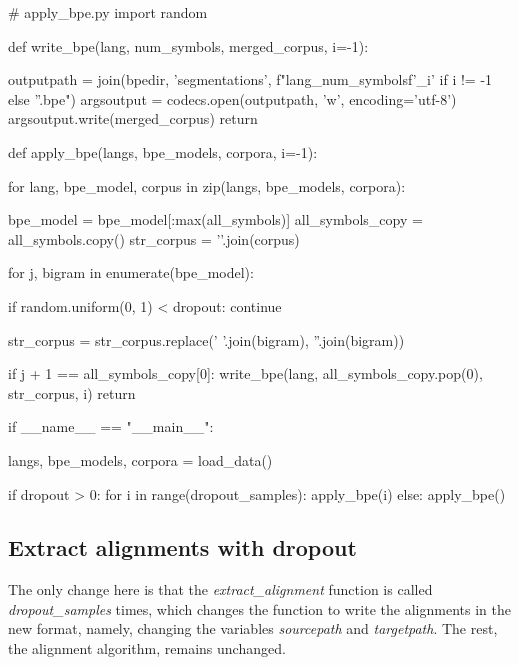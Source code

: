 \begin{python}
# apply_bpe.py
import random

def write_bpe(lang, num_symbols, merged_corpus, i=-1):

  outputpath = join(bpedir, 'segmentations', f"{lang}_{num_symbols}{f'_{i}' if i != -1 else ''}.bpe")
  argsoutput = codecs.open(outputpath, 'w', encoding='utf-8')
  argsoutput.write(merged_corpus)
  return

def apply_bpe(langs, bpe_models, corpora, i=-1):
    
  for lang, bpe_model, corpus in zip(langs, bpe_models, corpora):

    bpe_model = bpe_model[:max(all_symbols)]
    all_symbols_copy = all_symbols.copy()
    str_corpus = '\n'.join(corpus)

    for j, bigram in enumerate(bpe_model):

        if random.uniform(0, 1) < dropout:
            continue

      str_corpus = str_corpus.replace(' '.join(bigram), ''.join(bigram))

      if j + 1 == all_symbols_copy[0]:
        write_bpe(lang, all_symbols_copy.pop(0), str_corpus, i)
  return

if __name__ == "__main__":

  langs, bpe_models, corpora = load_data()

  if dropout > 0:
    for i in range(dropout_samples):
      apply_bpe(i)
  else:
      apply_bpe()
\end{python}

\subsection{Extract alignments with dropout}

The only change here is that the \emph{extract\_alignment} function is called \emph{dropout\_samples} times, which changes the function to write the alignments in the new format, namely, changing the variables \emph{sourcepath} and \emph{targetpath}. The rest, the alignment algorithm, remains unchanged.

